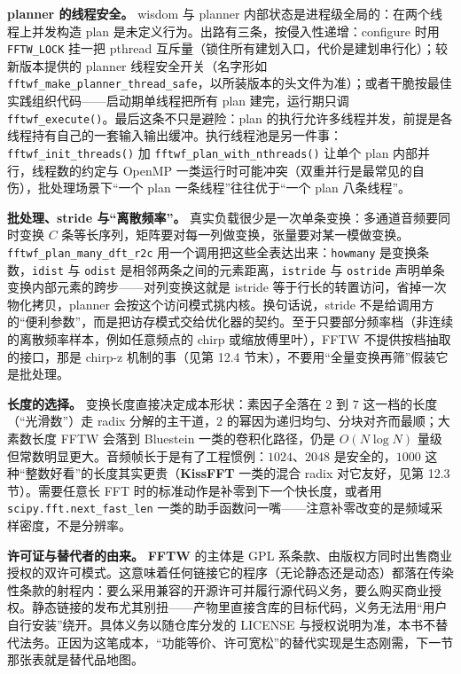 \documentclass[12pt,a4paper,fontset=fandol]{ctexbook}
\newcommand{\Fn}[1]{\texttt{#1()}}
\newcommand{\Tp}[1]{\texttt{#1}}
\newcommand{\Bk}{\allowbreak}
\newcommand{\Lib}[1]{\textbf{#1}}
\begin{document}
\textbf{planner 的线程安全。} wisdom 与 planner 内部状态是进程级全局的：在两个线程上并发构造 plan 是未定义行为。出路有三条，按侵入性递增：configure 时用 \Tp{FFTW\_LOCK} 挂一把 pthread 互斥量（锁住所有建划入口，代价是建划串行化）；较新版本提供的 planner 线程安全开关（名字形如 \Tp{fftwf\Bk\_make\Bk\_planner\Bk\_thread\Bk\_safe}，以所装版本的头文件为准）；或者干脆按最佳实践组织代码——启动期单线程把所有 plan 建完，运行期只调 \Fn{fftwf\_execute}。最后这条不只是避险：plan 的执行允许多线程并发，前提是各线程持有自己的一套输入输出缓冲。执行线程池是另一件事：\Fn{fftwf\_init\_threads} 加 \Fn{fftwf\_plan\_with\_nthreads} 让单个 plan 内部并行，线程数的约定与 OpenMP 一类运行时可能冲突（双重并行是最常见的自伤），批处理场景下``一个 plan 一条线程''往往优于``一个 plan 八条线程''。

\textbf{批处理、stride 与``离散频率''。} 真实负载很少是一次单条变换：多通道音频要同时变换 $C$ 条等长序列，矩阵要对每一列做变换，张量要对某一模做变换。\Tp{fftwf\Bk\_plan\Bk\_many\Bk\_dft\_r2c} 用一个调用把这些全表达出来：\Tp{howmany} 是变换条数，\Tp{idist} 与 \Tp{odist} 是相邻两条之间的元素距离，\Tp{istride} 与 \Tp{ostride} 声明单条变换内部元素的跨步——对列变换这就是 istride 等于行长的转置访问，省掉一次物化拷贝，planner 会按这个访问模式挑内核。换句话说，stride 不是给调用方的``便利参数''，而是把访存模式交给优化器的契约。至于只要部分频率档（非连续的离散频率样本，例如任意频点的 chirp 或缩放傅里叶），FFTW 不提供按档抽取的接口，那是 chirp-z 机制的事（见第 12.4 节末），不要用``全量变换再筛''假装它是批处理。

\textbf{长度的选择。} 变换长度直接决定成本形状：素因子全落在 $2$ 到 $7$ 这一档的长度（``光滑数''）走 radix 分解的主干道，$2$ 的幂因为递归均匀、分块对齐而最顺；大素数长度 FFTW 会落到 Bluestein 一类的卷积化路径，仍是 $O(N \log N)$ 量级但常数明显更大。音频帧长于是有了工程惯例：$1024$、$2048$ 是安全的，$1000$ 这种``整数好看''的长度其实更贵（\Lib{KissFFT} 一类的混合 radix 对它友好，见第 12.3 节）。需要任意长 FFT 时的标准动作是补零到下一个快长度，或者用 \Tp{scipy.fft\Bk.next\Bk\_fast\Bk\_len} 一类的助手函数问一嘴——注意补零改变的是频域采样密度，不是分辨率。

\textbf{许可证与替代者的由来。} \Lib{FFTW} 的主体是 GPL 系条款、由版权方同时出售商业授权的双许可模式。这意味着任何链接它的程序（无论静态还是动态）都落在传染性条款的射程内：要么采用兼容的开源许可并履行源代码义务，要么购买商业授权。静态链接的发布尤其别扭——产物里直接含库的目标代码，义务无法用``用户自行安装''绕开。具体义务以随仓库分发的 LICENSE 与授权说明为准，本书不替代法务。正因为这笔成本，``功能等价、许可宽松''的替代实现是生态刚需，下一节那张表就是替代品地图。
\end{document}
